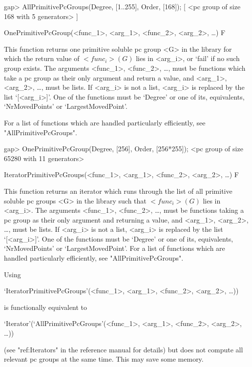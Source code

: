 \beginexample
gap> AllPrimitivePcGroups(Degree, [1..255], Order, [168]);
[ <pc group of size 168 with 5 generators> ]
\endexample


\>OnePrimitivePcGroup(<func_1>, <arg_1>, <func_2>, <arg_2>, \dots) F

This function returns one primitive soluble pc
group <G> in the  {\IRREDSOL} library for which the return value of $<func_i>(G)$ lies in
<arg_i>, or `fail' if no such group exists.  The arguments <func_1>, <func_2>, \dots,
must be {\GAP} functions which take a pc group as their only argument and return a
value, and <arg_1>, <arg_2>,
\dots,  must be lists. If <arg_i> is not a list, <arg_i> is replaced by the list
`[<arg_i>]'. One of the functions must be `Degree' or one of its, equivalents, `NrMovedPoints' or `LargestMovedPoint'.

For a list of functions which are handled particularly efficiently, see
"AllPrimitivePcGroups".

\beginexample
gap> OnePrimitivePcGroup(Degree, [256], Order, [256*255]);
<pc group of size 65280 with 11 generators>
\endexample

\>IteratorPrimitivePcGroups(<func_1>, <arg_1>, <func_2>, <arg_2>, \dots) F

This function returns an iterator which runs through the list of all primitive soluble
pc groups <G> in the  {\IRREDSOL} library such that
$<func_i>(G)$ lies in <arg_i>. The arguments <func_1>, <func_2>, \dots,
must be {\GAP} functions taking a pc group as their only argument and returning 
a value, and <arg_1>, <arg_2>, \dots, 
must be lists. If <arg_i> is not a list, <arg_i> is replaced by the list `[<arg_i>]'.
One of the functions must be `Degree' or one of its, equivalents, `NrMovedPoints' 
or `LargestMovedPoint'.
For a list of functions which are handled particularly efficiently, see
"AllPrimitivePcGroups".

Using 

`IteratorPrimitivePcGroups'(<func_1>, <arg_1>, <func_2>, <arg_2>, \dots)) 

is functionally equivalent to 

`Iterator'(`AllPrimitivePcGroups'(<func_1>, <arg_1>, <func_2>, <arg_2>, \dots))

(see "ref:Iterators" in the {\GAP} reference manual for details) but does not 
compute all relevant pc groups at the same time. 
This may save some memory. 




